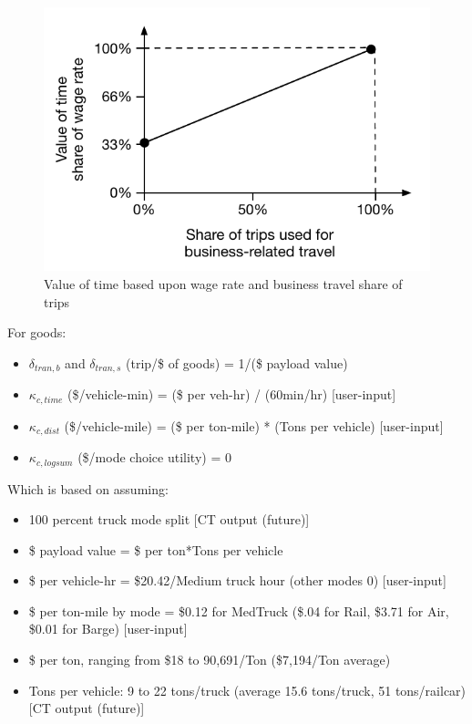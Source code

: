 \begin{figure}
\centering
\includegraphics[scale=0.75]{aa/revised-vot-shares.pdf}
\caption{Value of time based upon wage rate and business travel share of trips}
\label{fig:aa-vot}
\end{figure}

\vspace{10pt}
\noindent For goods:
\begin{itemize}
\item $\delta_{tran,b}$ and $\delta_{tran,s}$ (trip/\$ of goods) = 1/(\$ payload value)
\item $\kappa_{c,time}$ (\$/vehicle-min) = (\$ per veh-hr) / (60min/hr) [user-input]
\item $\kappa_{c,dist}$ (\$/vehicle-mile) =  (\$ per ton-mile) * (Tons per vehicle) [user-input]
\item $\kappa_{c,logsum}$ (\$/mode choice utility) = 0
\end{itemize}

\noindent Which is based on assuming:
\begin{itemize}
\item 100 percent truck mode split [CT output (future)]
\item \$ payload value = \$ per ton*Tons per vehicle
\item \$ per vehicle-hr = \$20.42/Medium truck hour (other modes 0) [user-input]
\item \$ per ton-mile by mode = \$0.12 for MedTruck (\$.04 for Rail, \$3.71 for Air, \$0.01 for 
Barge) [user-input]
\item \$ per ton, ranging from \$18 to 90,691/Ton  (\$7,194/Ton average) 
\item Tons per vehicle: 9 to 22 tons/truck (average 15.6 tons/truck, 51 tons/railcar) [CT 
output (future)]
\end{itemize}

